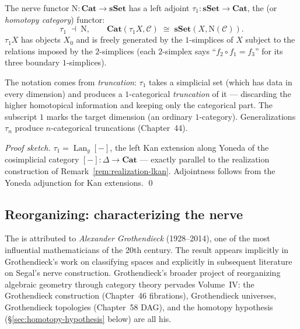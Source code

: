 \begin{theorem}
\label{thm:nerve-tau1-adj}
The nerve functor $\mathrm{N} : \mathbf{Cat} \to \mathbf{sSet}$ has a
left adjoint $\tau_1 : \mathbf{sSet} \to \mathbf{Cat}$, the
 (or \emph{homotopy category}) functor:
\begin{equation*}
  \tau_1 \;\dashv\; \mathrm{N}, \qquad
  \mathbf{Cat}(\tau_1 X, \mathcal{C}) \;\cong\; \mathbf{sSet}(X, \mathrm{N}(\mathcal{C})).
\end{equation*}
$\tau_1 X$ has objects $X_0$ and is freely generated by the $1$-simplices
of $X$ subject to the relations imposed by the $2$-simplices (each
$2$-simplex says ``$f_2 \circ f_1 = f_3$'' for its three boundary
$1$-simplices).
\end{theorem}

\begin{nameorigin}
The notation  comes from \emph{truncation}: $\tau_1$ takes
a simplicial set (which has data in every dimension) and produces a
$1$-categorical \emph{truncation} of it — discarding the higher
homotopical information and keeping only the categorical part. The
subscript $1$ marks the target dimension (an ordinary $1$-category).
Generalizations $\tau_n$ produce $n$-categorical truncations (Chapter~44).
\end{nameorigin}

\begin{proof}[Proof sketch]
$\tau_1 = \operatorname{Lan}_y [-]$, the left Kan extension along Yoneda
of the cosimplicial category $[-] : \Delta \to \mathbf{Cat}$ — exactly
parallel to the realization construction of
Remark~\ref{rem:realization-lkan}. Adjointness follows from the Yoneda
adjunction for Kan extensions.
\qed
\end{proof}

\subsection{Reorganizing: characterizing the nerve}

\begin{nameorigin}
The  is
attributed to \emph{Alexander Grothendieck} (1928--2014), one of the
most influential mathematicians of the 20th century. The result appears
implicitly in Grothendieck's work on classifying spaces and explicitly
in subsequent literature on Segal's nerve construction. Grothendieck's
broader project of reorganizing algebraic geometry through category
theory pervades Volume~IV: the Grothendieck construction (Chapter~46
fibrations), Grothendieck universes, Grothendieck topologies (Chapter~58
DAG), and the homotopy hypothesis (\S\ref{sec:homotopy-hypothesis}
below) are all his.
\end{nameorigin}

